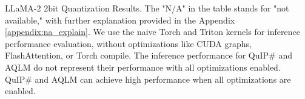 \begin{table}[hbt!]
\centering
\caption{LLaMA-2 2bit Quantization Results. The "N/A" in the table stands for "not available," with further explanation provided in the Appendix \ref{appendix:na_explain}.
\footnotesize{\footnotemark[1] We use the naive Torch and Triton kernels for inference performance evaluation, without optimizations like CUDA graphs, FlashAttention, or Torch compile. The inference performance for QuIP\# and AQLM do not represent their performance with all optimizations enabled. QuIP\# and AQLM can achieve high performance when all optimizations are enabled.}} 
\label{tab:llama2_2bit_avg}

\begin{subtable}{\textwidth}
\centering
\caption{7B results}
\end{subtable}


\end{table}
